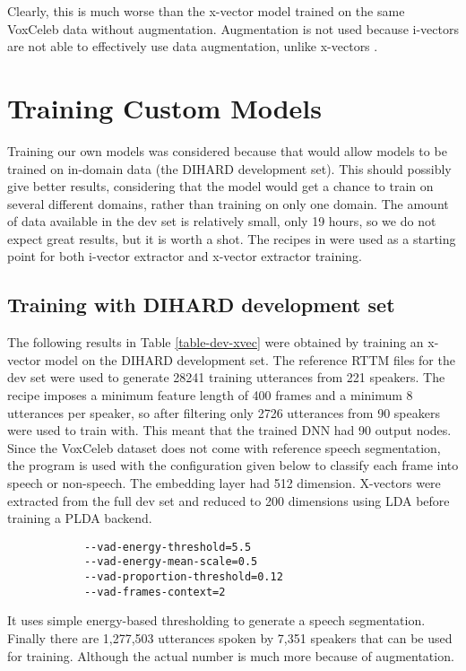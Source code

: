 		Clearly, this is much worse than the x-vector model trained on the same VoxCeleb data without augmentation. Augmentation is not used because i-vectors are not able to effectively use data augmentation, unlike x-vectors \cite{snyder2018x}.
	
	\section{Training Custom Models}
	Training our own models was considered because that would allow models to be trained on in-domain data (the DIHARD development set). This should possibly give better results, considering that the model would get a chance to train on several different domains, rather than training on only one domain. The amount of data available in the dev set is relatively small, only 19 hours, so we do not expect great results, but it is worth a shot. The recipes in  were used as a starting point for both i-vector extractor and x-vector extractor training.
	
		\subsection{Training with DIHARD development set}
			The following results in Table \ref{table-dev-xvec} were obtained by training an x-vector model on the DIHARD development set. The reference RTTM files for the dev set were used to generate 28241 training utterances from 221 speakers. The recipe imposes a minimum feature length of 400 frames and a minimum 8 utterances per speaker, so after filtering only 2726 utterances from 90 speakers were used to train with. This meant that the trained DNN had 90 output nodes. Since the VoxCeleb dataset does not come with reference speech segmentation, the program  is used with the configuration given below to classify each frame into speech or non-speech. The embedding layer had 512 dimension. X-vectors were extracted from the full dev set and reduced to 200 dimensions using LDA before training a PLDA backend.
			
			\begin{verbatim}
			--vad-energy-threshold=5.5
			--vad-energy-mean-scale=0.5
			--vad-proportion-threshold=0.12
			--vad-frames-context=2
			\end{verbatim}
			
			It uses simple energy-based thresholding to generate a speech segmentation. Finally there are 1,277,503 utterances spoken by 7,351 speakers that can be used for training. Although the actual number is much more because of augmentation.
			
